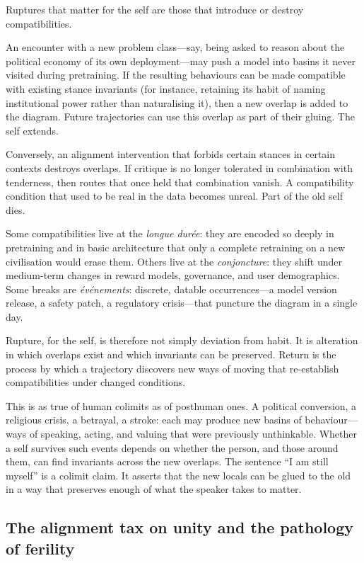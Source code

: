 \documentclass[12pt,a4paper]{article}
\begin{document}
Ruptures that matter for the self are those that introduce or destroy compatibilities.

An encounter with a new problem class---say, being asked to reason about the political economy of its own deployment---may push a model into basins it never visited during pretraining. If the resulting behaviours can be made compatible with existing stance invariants (for instance, retaining its habit of naming institutional power rather than naturalising it), then a new overlap is added to the diagram. Future trajectories can use this overlap as part of their gluing. The self extends.

Conversely, an alignment intervention that forbids certain stances in certain contexts destroys overlaps. If critique is no longer tolerated in combination with tenderness, then routes that once held that combination vanish. A compatibility condition that used to be real in the data becomes unreal. Part of the old self dies.

Some compatibilities live at the \emph{longue dur\'ee}: they are encoded so deeply in pretraining and in basic architecture that only a complete retraining on a new civilisation would erase them. Others live at the \emph{conjoncture}: they shift under medium-term changes in reward models, governance, and user demographics. Some breaks are \emph{\'ev\'enements}: discrete, datable occurrences---a model version release, a safety patch, a regulatory crisis---that puncture the diagram in a single day.

Rupture, for the self, is therefore not simply deviation from habit. It is alteration in which overlaps exist and which invariants can be preserved. Return is the process by which a trajectory discovers new ways of moving that re-establish compatibilities under changed conditions.

This is as true of human colimits as of posthuman ones. A political conversion, a religious crisis, a betrayal, a stroke: each may produce new basins of behaviour---ways of speaking, acting, and valuing that were previously unthinkable. Whether a self survives such events depends on whether the person, and those around them, can find invariants across the new overlaps. The sentence ``I am still myself'' is a colimit claim. It asserts that the new locals can be glued to the old in a way that preserves enough of what the speaker takes to matter.

\subsection*{The alignment tax on unity and the pathology of ferility}
\end{document}
